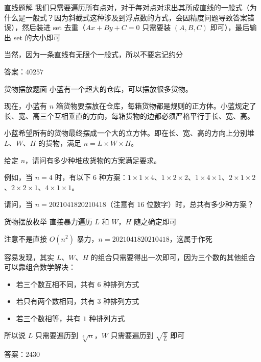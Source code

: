 \documentclass{pptt}
\begin{document}
\begin{frame}{直线}{题解}
    我们只需要遍历所有点对，对于每对点对求出其所成直线的一般式（为什么是一般式？因为斜截式这种涉及到浮点数的方式，会因精度问题导致答案错误），然后装进 set 去重（$Ax+By+C=0$ 只需要装 $(A,B,C)$ 即可），最后输出 set 的大小即可

    当然，因为一条直线有无限个一般式，所以不要忘记约分

    答案：$40257$
\end{frame}

\begin{frame}{货物摆放}{题面}
    小蓝有一个超大的仓库，可以摆放很多货物。

    现在，小蓝有 $n$ 箱货物要摆放在仓库，每箱货物都是规则的正方体。小蓝规定了长、宽、高三个互相垂直的方向，每箱货物的边都必须严格平行于长、宽、高。

    小蓝希望所有的货物最终摆成一个大的立方体。即在长、宽、高的方向上分别堆 $L$、$W$、$H$ 的货物，满足 $n=L \times W \times H$。

    给定 $n$，请问有多少种堆放货物的方案满足要求。

    例如，当 $n=4$ 时，有以下 $6$ 种方案：$1 \times 1 \times 4$、$1 \times 2 \times 2$、$1 \times 4 \times 1$、$2 \times 1 \times 2$、$2 \times 2 \times 1$、$4 \times 1 \times 1$。

    请问，当 $n=2021041820210418$（注意有 $16$ 位数字）时，总共有多少种方案？
\end{frame}

\begin{frame}{货物摆放}{枚举}
    直接暴力遍历 $L$ 和 $W$，$H$ 随之确定即可

    注意不是直接 $O(n^2)$ 暴力，$n=2021041820210418$，这属于作死

    容易发现，其实 $L$、$W$、$H$ 的组合只需要得出一次即可，因为三个数的其他组合可以靠组合数学解决：

    \begin{itemize}
        \item 若三个数互相不同，共有 $6$ 种排列方式
        \item 若只有两个数相同，共有 $3$ 种排列方式
        \item 若三个数相等，共有 $1$ 种排列方式
    \end{itemize}

    所以说 $L$ 只需要遍历到 $\sqrt[3]{n}$，$W$ 只需要遍历到 $\sqrt{\frac{n}{L}}$ 即可

    答案：$2430$
\end{frame}
\end{document}
